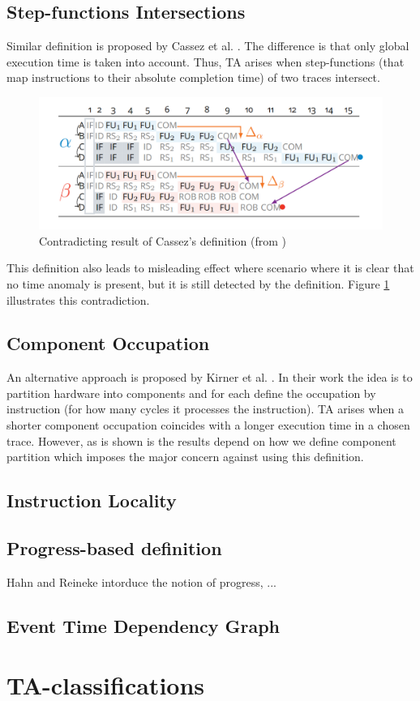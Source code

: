\subsection{Step-functions Intersections}

Similar definition is proposed by Cassez et al. \cite{cassez_what_2012}. The difference is that only global execution time is taken into account. Thus, TA arises when step-functions (that map instructions to their absolute completion time) of two traces intersect. 

\begin{figure}[!htb]
    \centering
    \includegraphics[width=\textwidth]{figures/step-func-2-bad.png}
    \caption{Contradicting result of Cassez's definition (from \cite{binder_definitions_2022})}
    \label{fig:step-2}
\end{figure}

This definition also leads to misleading effect where scenario \cite{binder_definitions_2022} where it is clear that no time anomaly is present, but it is still detected by the definition. Figure \ref{fig:step-2} illustrates this contradiction. 

\subsection{Component Occupation}

An alternative approach is proposed by Kirner et al. \cite{kirner_precise_2009}. In their work the idea is to partition hardware into components and for each define the occupation by instruction (for how many cycles it processes the instruction). TA arises when a shorter component occupation coincides with a longer execution time in a chosen trace. However, as is shown is \cite{binder_definitions_2022} the results depend on how we define component partition which imposes the major concern against using this definition.

\subsection{Instruction Locality}
\subsection{Progress-based definition}

Hahn and Reineke \cite{hahn_design_2020} intorduce the notion of progress, ... \cite{gruin_minotaur_2023}

\subsection{Event Time Dependency Graph}



\section{TA-classifications}

